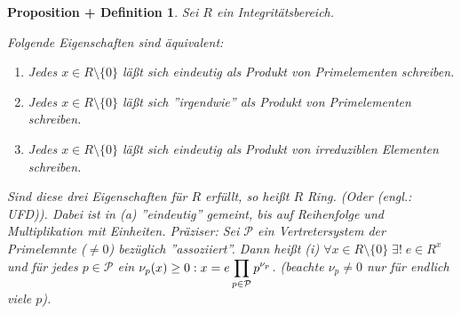 \documentclass[a4paper,10pt,german]{scrbook}
\theoremstyle{saetze}
\theoremstyle{definitionen}
\newtheorem{PropDef}[Def]{Proposition + Definition}
\begin{document}
\begin{PropDef}
\label{2.21}
Sei $R$ ein Integritätsbereich.
\begin{enum}
\item Folgende Eigenschaften sind äquivalent:
    \begin{enumerate}
        \item[(i)] Jedes $x \in R\setminus\{0\}$ läßt sich eindeutig
        als Produkt von Primelementen schreiben.
        \item[(ii)] Jedes $x \in R\setminus\{0\}$ läßt sich
        ''irgendwie'' als Produkt von Primelementen schreiben.
        \item[(iii)] Jedes $x \in R\setminus\{0\}$ läßt sich eindeutig als
        Produkt von irreduziblen Elementen schreiben.
    \end{enumerate}

\item Sind diese drei Eigenschaften für $R$ erfüllt, so heißt $R$
 Ring. (Oder  (engl.: UFD)). Dabei
ist in (a) ''eindeutig'' gemeint, bis auf Reihenfolge und
Multiplikation mit Einheiten. Präziser: Sei $\mathcal{P}$ ein
Vertretersystem der Primelemnte ($\neq 0$) bezüglich
''assoziiert''.
\newline Dann heißt (i) $\forall x \in R \setminus\{0\}\; \exists!\;e \in
R^x$ und für jedes $p \in \mathcal{P}$ ein $\displaystyle\nu_p(x) \geq
0:x=e\prod_{p \in \mathcal{P}} p^{\nu_p}$. (beachte $\nu_p \neq 0$
nur für endlich viele $p$).
\end{enum}
\end{PropDef}
\end{document}
